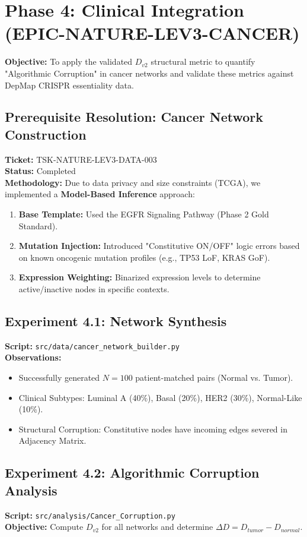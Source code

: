 \documentclass[11pt]{article}
\begin{document}
\section{Phase 4: Clinical Integration (EPIC-NATURE-LEV3-CANCER)}
\textbf{Objective:} To apply the validated $D_{v2}$ structural metric to quantify "Algorithmic Corruption" in cancer networks and validate these metrics against DepMap CRISPR essentiality data.

\subsection{Prerequisite Resolution: Cancer Network Construction}
\textbf{Ticket:} TSK-NATURE-LEV3-DATA-003 \\
\textbf{Status:} Completed \\
\textbf{Methodology:}
Due to data privacy and size constraints (TCGA), we implemented a \textbf{Model-Based Inference} approach:
\begin{enumerate}
    \item \textbf{Base Template:} Used the EGFR Signaling Pathway (Phase 2 Gold Standard).
    \item \textbf{Mutation Injection:} Introduced "Constitutive ON/OFF" logic errors based on known oncogenic mutation profiles (e.g., TP53 LoF, KRAS GoF).
    \item \textbf{Expression Weighting:} Binarized expression levels to determine active/inactive nodes in specific contexts.
\end{enumerate}

\subsection{Experiment 4.1: Network Synthesis}
\textbf{Script:} \texttt{src/data/cancer\_network\_builder.py} \\
\textbf{Observations:}
\begin{itemize}
    \item Successfully generated $N=100$ patient-matched pairs (Normal vs. Tumor).
    \item Clinical Subtypes: Luminal A (40\%), Basal (20\%), HER2 (30\%), Normal-Like (10\%).
    \item Structural Corruption: Constitutive nodes have incoming edges severed in Adjacency Matrix.
\end{itemize}

\subsection{Experiment 4.2: Algorithmic Corruption Analysis}
\textbf{Script:} \texttt{src/analysis/Cancer\_Corruption.py} \\
\textbf{Objective:} Compute $D_{v2}$ for all networks and determine $\Delta D = D_{tumor} - D_{normal}$.
\end{document}
